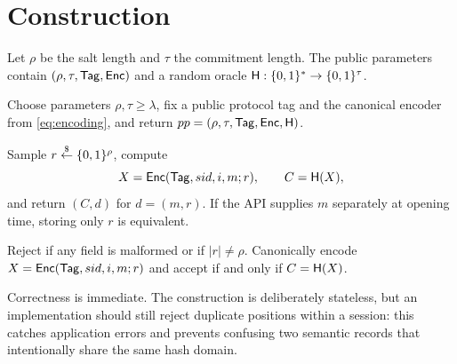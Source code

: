 \section{Construction}
\label{sec:construction}

Let $\rho$ be the salt length and $\tau$ the commitment length.  The public
parameters contain $(\rho,\tau,\mathsf{Tag},\mathsf{Enc})$ and a random oracle
$\mathsf{H}:\{0,1\}^*\to\{0,1\}^\tau$.

 Choose parameters $\rho,\tau\geq\lambda$, fix a
public protocol tag and the canonical encoder from \cref{eq:encoding}, and
return $pp=(\rho,\tau,\mathsf{Tag},\mathsf{Enc},\mathsf{H})$.

 Sample $r\mathrel{\mathop{\leftarrow}\limits^{\$}}\{0,1\}^\rho$, compute
\[
  X=\mathsf{Enc}(\mathsf{Tag},sid,i,m;r),\qquad C=\mathsf{H}(X),
\]
and return $(C,d)$ for $d=(m,r)$.  If the API supplies $m$ separately at
opening time, storing only $r$ is equivalent.

 Reject if any field is malformed or if
$|r|\neq\rho$.  Canonically encode
$X=\mathsf{Enc}(\mathsf{Tag},sid,i,m;r)$ and accept if and only if $C=\mathsf{H}(X)$.

Correctness is immediate.  The construction is deliberately stateless, but an
implementation should still reject duplicate positions within a session:
this catches application errors and prevents confusing two semantic records
that intentionally share the same hash domain.
